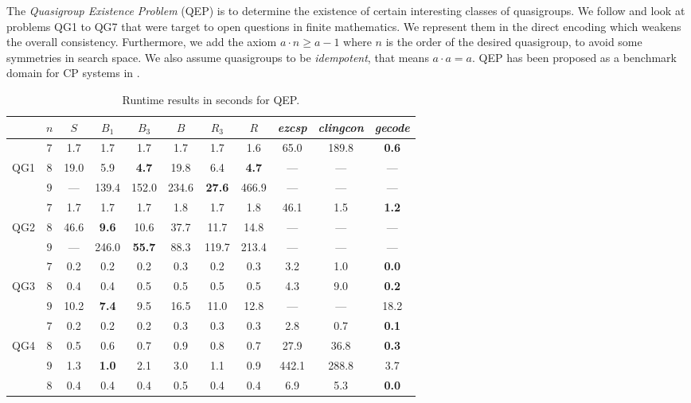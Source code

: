 \documentclass{tlp}
\newcommand{\systemname}[1]{\emph{#1}}
\newcommand{\encsup}{$S$}
\newcommand{\encbou}{$B$}
\newcommand{\encran}{$R$}
\newcommand{\encbouh}[1]{\encbou$_{#1}$}
\newcommand{\encranh}[1]{\encran$_{#1}$}
\begin{document}
The \emph{Quasigroup Existence Problem} (QEP) is to determine the existence of certain interesting classes of quasigroups. We follow  and look at problems QG1 to QG7 that were target to open questions in finite mathematics.
We represent them in the direct encoding which weakens the overall consistency. Furthermore,
we add the axiom $a \cdot n \geq a - 1$ where $n$ is the order of the desired quasigroup, to avoid some symmetries in search space. We also assume quasigroups to be \emph{idempotent}, that means $a \cdot a = a$. QEP has been proposed as a benchmark domain for CP systems in .
\begin{table}
\caption{Runtime results in seconds for QEP.}
\label{tab:qep}
\begin{minipage}{\textwidth}
\begin{tabular}{ccccccccccc} \hline
 & $n$ & \encsup & \encbouh{1} &\encbouh{3} & \encbou & \encranh{3} & \encran & \systemname{ezcsp} & \systemname{clingcon} & \systemname{gecode} \\ \hline\hline
& $7$ & 1.7 & 1.7 & 1.7 & 1.7 & 1.7 & 1.6 & 65.0 & 189.8 & \textbf{0.6} \\
QG1 & $8$ & 19.0& 5.9 &\textbf{4.7} &19.8 & 6.4 &\textbf{4.7} & --- & --- & --- \\
& $9$ & --- & 139.4 &152.0& 234.6 & \textbf{27.6} &466.9 & --- & --- & --- \\ \noalign{\vspace {.2cm}}
& $7$ & 1.7 & 1.7 &1.7 & 1.8 & 1.7 & 1.8 & 46.1 & 1.5 & \textbf{1.2} \\
QG2 & $8$ & 46.6& \textbf{9.6} &10.6 &37.7 &11.7 &14.8 & --- & --- & --- \\
& $9$ & --- & 246.0 &\textbf{55.7}& 88.3 &119.7 &213.4 & --- & --- & --- \\ \noalign{\vspace {.2cm}}
& $7$ & 0.2 & 0.2 &0.2 & 0.3 & 0.2 & 0.3 & 3.2 & 1.0 & \textbf{0.0} \\
QG3 & $8$ & 0.4 & 0.4 &0.5 & 0.5 & 0.5 & 0.5 & 4.3 & 9.0 & \textbf{0.2} \\
& $9$ &10.2 &\textbf{7.4} &9.5 &16.5 &11.0 &12.8 & --- & --- & 18.2 \\ \noalign{\vspace {.2cm}}
& $7$ & 0.2 & 0.2 &0.2 & 0.3 & 0.3 & 0.3 & 2.8 & 0.7 & \textbf{0.1} \\
QG4 & $8$ & 0.5 & 0.6 &0.7 & 0.9 & 0.8 & 0.7 &27.9 &36.8 & \textbf{0.3} \\
& $9$ & 1.3 & \textbf{1.0} &2.1 &3.0 &1.1 &0.9 &442.1&288.8& 3.7 \\ \noalign{\vspace {.2cm}}
& $8$ & 0.4 & 0.4 &0.4 & 0.5 & 0.4 & 0.4 & 6.9 & 5.3 & \textbf{0.0} \\

\end{tabular}
\end{minipage}
\end{table}
\end{document}
